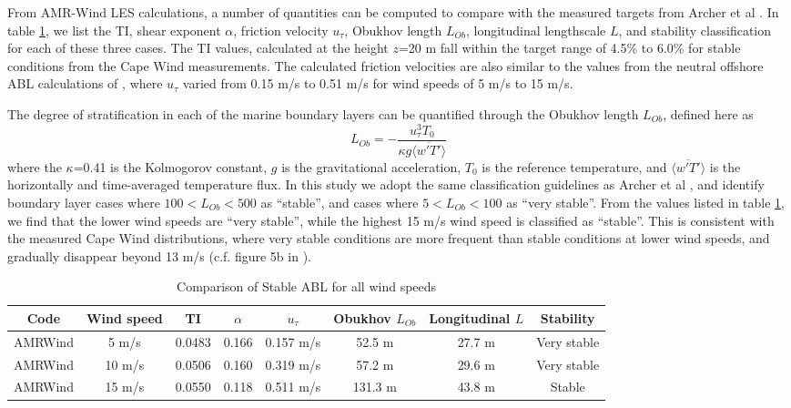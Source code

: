 From AMR-Wind LES calculations, a number of quantities can be computed
to compare with the measured targets from Archer et al
\cite{archer2016predominance}.  In
table \ref{tab:CompareAMRallWS}, we list the TI, shear exponent
$\alpha$, friction velocity $u_\tau$, Obukhov length $L_{Ob}$,
longitudinal lengthscale $L$, and stability classification for each of
these three cases.  The TI values, calculated at the height $z$=20 m
fall within the target range of 4.5\% to 6.0\% for stable conditions
from the Cape Wind measurements.  The calculated friction velocities
are also similar to the values from the neutral offshore ABL
calculations of \cite{cheung2020large}, where $u_\tau$ varied from
0.15 m/s to 0.51 m/s for wind speeds of 5 m/s to 15 m/s.

The degree of stratification in each of the marine boundary layers can
be quantified through the Obukhov length $L_{Ob}$, defined here as
\begin{equation}
  L_{Ob} = -\frac{u_\tau^3 T_0}{\kappa g \langle \overline{w'T'} \rangle}
\end{equation}
where the $\kappa$=0.41 is the Kolmogorov constant, $g$ is the
gravitational acceleration, $T_0$ is the reference temperature, and
$\langle \overline{w'T'} \rangle$ is the horizontally and
time-averaged temperature flux.  In this study we adopt the same
classification guidelines as Archer et al
\cite{archer2016predominance}, and identify boundary layer cases where
$100 < L_{Ob} < 500$ as ``stable'', and cases where $5 < L_{Ob}<100$
as ``very stable''.  From the values listed in table
\ref{tab:CompareAMRallWS}, we find that the lower wind speeds are
``very stable'', while the highest 15 m/s wind speed is classified as
``stable''.  This is consistent with the measured Cape Wind
distributions, where very stable conditions are more frequent than
stable conditions at lower wind speeds, and gradually disappear beyond
13 m/s (c.f. figure 5b in \cite{archer2016predominance}).

\begin{table}
\caption{\label{tab:CompareAMRallWS} Comparison of Stable ABL for all
  wind speeds} \centering
\begin{tabular}{cccccccc}
  \hline
  Code & Wind speed   & TI     & $\alpha$& $u_\tau$ & Obukhov $L_{Ob}$ & Longitudinal $L$ & Stability \\
  \hline
  AMRWind & 5 m/s      & 0.0483 &  0.166 &  0.157 m/s  &  52.5 m & 27.7 m  & Very stable\\
  AMRWind & 10 m/s     & 0.0506 &  0.160 &  0.319 m/s  &  57.2 m & 29.6 m  & Very stable\\
  AMRWind & 15 m/s     & 0.0550 &  0.118 &  0.511 m/s  & 131.3 m & 43.8 m  & Stable \\
  \hline
\end{tabular}
\end{table}

